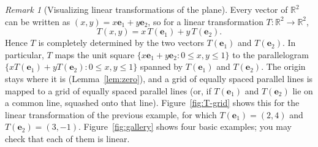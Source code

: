 \documentclass[11pt]{article}
\theoremstyle{definition}
\theoremstyle{plain}
\theoremstyle{remark}
\newtheorem{remark}[definition]{Remark}
\begin{document}
\begin{remark}[Visualizing linear transformations of the plane]
    Every vector of $\mathbb{R}^2$ can be written as $(x, y) = x \mathbf{e}_1 + y \mathbf{e}_2$, so for a linear transformation $T: \mathbb{R}^2 \to \mathbb{R}^2$,
    \[T(x, y) = x\,T(\mathbf{e}_1) + y\,T(\mathbf{e}_2).\]
    Hence $T$ is completely determined by the two vectors $T(\mathbf{e}_1)$ and $T(\mathbf{e}_2)$. In particular, $T$ maps the unit square $\{x \mathbf{e}_1 + y \mathbf{e}_2 : 0 \leq x, y \leq 1\}$ to the parallelogram $\{x T(\mathbf{e}_1) + y T(\mathbf{e}_2) : 0 \leq x, y \leq 1\}$ spanned by $T(\mathbf{e}_1)$ and $T(\mathbf{e}_2)$. The origin stays where it is (Lemma~\ref{lem:zero}), and a grid of equally spaced parallel lines is mapped to a grid of equally spaced parallel lines (or, if $T(\mathbf{e}_1)$ and $T(\mathbf{e}_2)$ lie on a common line, squashed onto that line). Figure~\ref{fig:T-grid} shows this for the linear transformation of the previous example, for which $T(\mathbf{e}_1) = (2, 4)$ and $T(\mathbf{e}_2) = (3, -1)$. Figure~\ref{fig:gallery} shows four basic examples; you may check that each of them is linear.
\end{remark}
\end{document}
